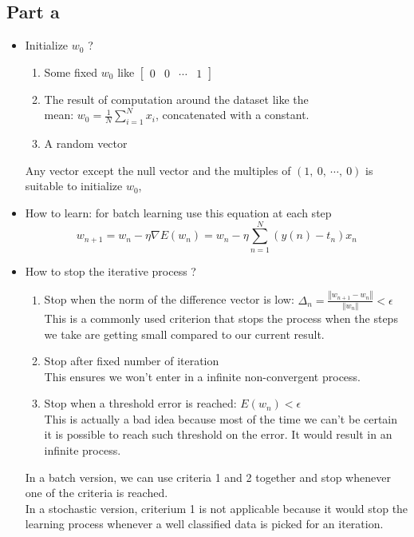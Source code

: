 \documentclass[a4paper, 10pt]{article}
\begin{document}
\subsection{Part a}
\begin{itemize}[label=$\square$]
    \item Initialize $w_0$ ?
    \begin{enumerate}
        \item Some fixed $w_0$ like $\begin{bmatrix}0 & 0 & \cdots & 1\end{bmatrix}$
        \item The result of computation around the dataset like the \\mean: $w_0 = \frac{1}{N}\sum_{i=1}^N x_i$, 
        concatenated with a constant.
        \item A random vector
    \end{enumerate}
    Any vector except the null vector and the multiples of $(1,\ 0,\ \cdots,\ 0)$ is suitable to initialize $w_0$, 
    \item How to learn: for batch learning use this equation at each step
    $$
    w_{n+1} = w_n - \eta \nabla E(w_n) = w_n - \eta \sum_{n=1}^{N}\left(y(n)-t_n\right)x_n
    $$
    \item How to stop the iterative process ?
    \begin{enumerate}
    \item Stop when the norm of the difference vector is low: $\Delta_n = \frac{\left\Vert w_{n+1} - w_n\right\Vert}{\left\Vert w_n \right\Vert} < \epsilon$
    \\
    This is a commonly used criterion that stops the process when the steps we take are getting small compared to our current result.
    \item Stop after fixed number of iteration
    \\
    This ensures we won't enter in a infinite non-convergent process. 
    \item Stop when a threshold error is reached: $E(w_n) < \epsilon $
    \\
    This is actually a bad idea because most of the time we can't be certain it is possible to reach such threshold on the error.
    It would result in an infinite process.
    \end{enumerate}
    In a batch version, we can use criteria 1 and 2 together and stop whenever one of 
    the criteria is reached.
    \\
    In a stochastic version, criterium 1 is not applicable because it would stop the learning process whenever a well classified data
    is picked for an iteration.
\end{itemize}
\end{document}
